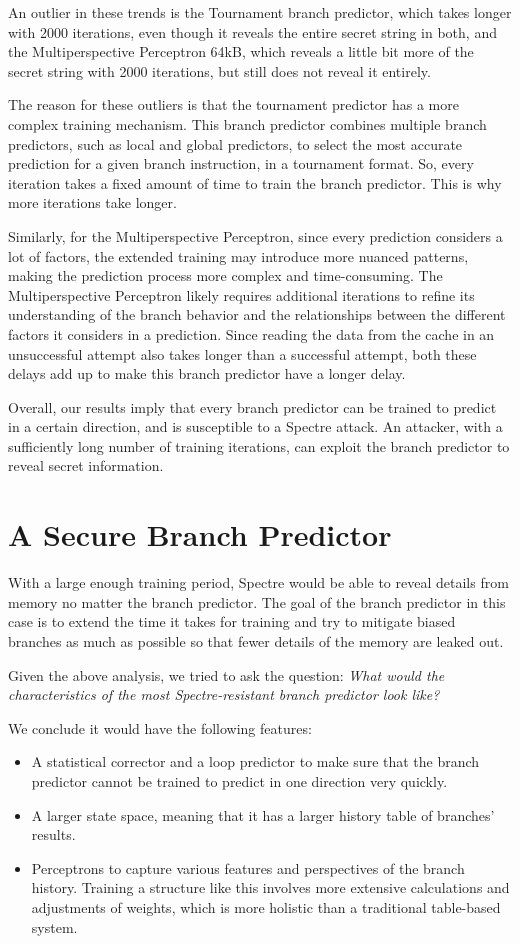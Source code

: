 \documentclass[twocolumn,showpacs,%
  nofootinbib,aps,superscriptaddress,%
  eqsecnum,prd,notitlepage,showkeys,10pt]{revtex4-1}
\begin{document}
An outlier in these trends is the Tournament branch predictor, which takes longer with 2000 iterations, even though it reveals the entire secret string in both, and the Multiperspective Perceptron 64kB, which reveals a little bit more of the secret string with 2000 iterations, but still does not reveal it entirely. 

The reason for these outliers is that the tournament predictor has a more complex training mechanism. This branch predictor combines multiple branch predictors, such as local and global predictors, to select the most accurate prediction for a given branch instruction, in a tournament format. So, every iteration takes a fixed amount of time to train the branch predictor. This is why more iterations take longer.

Similarly, for the Multiperspective Perceptron, since every prediction considers a lot of factors, the extended training may introduce more nuanced patterns, making the prediction process more complex and time-consuming. The Multiperspective Perceptron likely requires additional iterations to refine its understanding of the branch behavior and the relationships between the different factors it considers in a prediction. Since reading the data from the cache in an unsuccessful attempt also takes longer than a successful attempt, both these delays add up to make this branch predictor have a longer delay.

Overall, our results imply that every branch predictor can be trained to predict in a certain direction, and is susceptible to a Spectre attack. An attacker, with a sufficiently long number of training iterations, can exploit the branch predictor to reveal secret information.

\section{A Secure Branch Predictor}

With a large enough training period, Spectre would be able to reveal details from memory no matter the branch predictor. The goal of the branch predictor in this case is to extend the time it takes for training and try to mitigate biased branches as much as possible so that fewer details of the memory are leaked out.

Given the above analysis, we tried to ask the question: \textit{What would the characteristics of the most Spectre-resistant branch predictor look like?}

We conclude it would have the following features:
\begin{itemize}
    \item A statistical corrector and a loop predictor to make sure that the branch predictor cannot be trained to predict in one direction very quickly.
    \item A larger state space, meaning that it has a larger history table of branches' results.
    \item Perceptrons to capture various features and perspectives of the branch history. Training a structure like this involves more extensive calculations and adjustments of weights, which is more holistic than a traditional table-based system.
\end{itemize}
\end{document}
